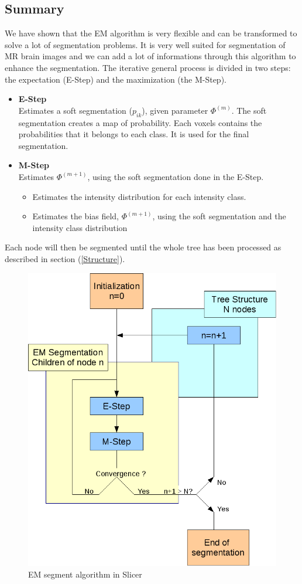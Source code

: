 \subsection{Summary}\label{SUMMARY}
We have shown that the EM algorithm is very flexible and can be transformed to solve a lot of segmentation problems. It is very well suited for segmentation of MR brain images and we can add a lot of informations through this algorithm to enhance the segmentation. The iterative general process is divided in two steps: the expectation (E-Step) and the maximization (the M-Step).

  \begin{itemize}
  \item \textbf{E-Step}\\  
  Estimates a soft segmentation ($p_{ik}$), given parameter $\Phi^{(m)}$. The soft segmentation creates a map of probability. Each voxels contains the probabilities that it belongs to each class. It is used for the final segmentation.
  
  \item \textbf{M-Step}\\
  Estimates $\Phi^{(m+1)}$, using the soft segmentation done in the E-Step.
  
    \begin{itemize}
    \item Estimates the intensity distribution for each intensity class.    
    \item Estimates the bias field, $\Phi^{(m+1)}$, using the soft segmentation and the intensity class distribution
    \end{itemize}
  \end{itemize}
  
Each node will then be segmented until the whole tree has been processed as described in section (\ref{Structure}).

  \begin{figure}[ht]\centering
  \includegraphics[width=.6\textwidth]{Images/Graphics/workflowtheorical.png}
  \caption{EM segment algorithm in Slicer}\label{fig:EMSSlicer}
  \end{figure}
  
